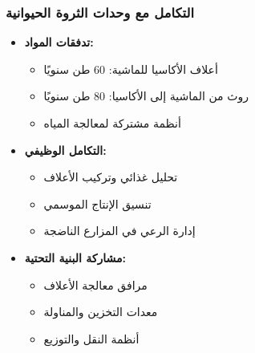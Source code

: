 \subsubsection{التكامل مع وحدات الثروة الحيوانية}
\begin{itemize}
    \item \textbf{تدفقات المواد:}
    \begin{itemize}
        \item أعلاف الأكاسيا للماشية: 60 طن سنويًا
        \item روث من الماشية إلى الأكاسيا: 80 طن سنويًا
        \item أنظمة مشتركة لمعالجة المياه
    \end{itemize}
    \item \textbf{التكامل الوظيفي:}
    \begin{itemize}
        \item تحليل غذائي وتركيب الأعلاف
        \item تنسيق الإنتاج الموسمي
        \item إدارة الرعي في المزارع الناضجة
    \end{itemize}
    \item \textbf{مشاركة البنية التحتية:}
    \begin{itemize}
        \item مرافق معالجة الأعلاف
        \item معدات التخزين والمناولة
        \item أنظمة النقل والتوزيع
    \end{itemize}
\end{itemize}

